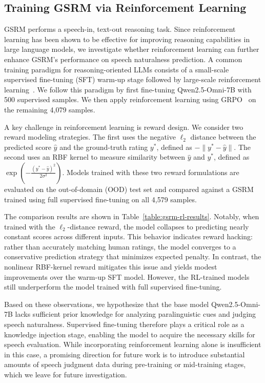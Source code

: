 \subsection{Training GSRM via Reinforcement Learning} \label{sec:gsrm_rl}
GSRM performs a speech-in, text-out reasoning task. Since reinforcement learning has been shown to be effective for improving reasoning capabilities in large language models, we investigate whether reinforcement learning can further enhance GSRM’s performance on speech naturalness prediction. A common training paradigm for reasoning-oriented LLMs consists of a small-scale supervised fine-tuning (SFT) warm-up stage followed by large-scale reinforcement learning~\cite{guo2025deepseek, shen2025satori}. We follow this paradigm by first fine-tuning Qwen2.5-Omni-7B with 500 supervised samples. We then apply reinforcement learning using GRPO~\cite{guo2025deepseek} on the remaining 4,079 samples.

A key challenge in reinforcement learning is reward design. We consider two reward modeling strategies. The first uses the negative $\ell_2$ distance between the predicted score $\hat{y}$ and the ground-truth rating $y^*$, defined as $-\lVert y^* - \hat{y} \rVert$. The second uses an RBF kernel to measure similarity between $\hat{y}$ and $y^*$, defined as $\exp\!\left(-\frac{(y^* - \hat{y})^2}{2\sigma^2}\right)$. Models trained with these two reward formulations are evaluated on the out-of-domain (OOD) test set and compared against a GSRM trained using full supervised fine-tuning on all 4,579 samples.

The comparison results are shown in Table~\ref{table:gsrm-rl-results}. Notably, when trained with the $\ell_2$-distance reward, the model collapses to predicting nearly constant scores across different inputs. This behavior indicates reward hacking: rather than accurately matching human ratings, the model converges to a conservative prediction strategy that minimizes expected penalty. In contrast, the nonlinear RBF-kernel reward mitigates this issue and yields modest improvements over the warm-up SFT model. However, the RL-trained models still underperform the model trained with full supervised fine-tuning.

Based on these observations, we hypothesize that the base model Qwen2.5-Omni-7B lacks sufficient prior knowledge for analyzing paralinguistic cues and judging speech naturalness. Supervised fine-tuning therefore plays a critical role as a knowledge injection stage, enabling the model to acquire the necessary skills for speech evaluation. While incorporating reinforcement learning alone is insufficient in this case, a promising direction for future work is to introduce substantial amounts of speech judgment data during pre-training or mid-training stages, which we leave for future investigation.

